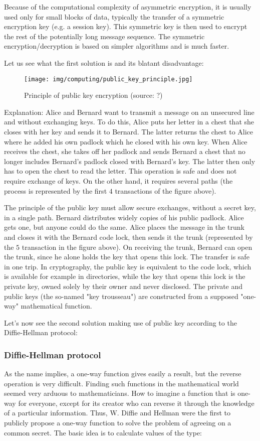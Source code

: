 	Because of the computational complexity of asymmetric encryption, it is usually used only for small blocks of data, typically the transfer of a symmetric encryption key (e.g. a session key). This symmetric key is then used to encrypt the rest of the potentially long message sequence. The symmetric encryption/decryption is based on simpler algorithms and is much faster.
	
	Let us see what the first solution is and its blatant disadvantage:
	\begin{figure}[H]
		\centering
		\texttt{[image: img/computing/public\_key\_principle.jpg]}
		\caption[Principle of public key encryption]{Principle of public key encryption (source: ?)}
	\end{figure}
	Explanation: Alice and Bernard want to transmit a message on an unsecured line and without exchanging keys. To do this, Alice puts her letter in a chest that she closes with her key and sends it to Bernard. The latter returns the chest to Alice where he added his own padlock which he closed with his own key. When Alice receives the chest, she takes off her padlock and sends Bernard a chest that no longer includes Bernard's padlock closed with Bernard's key. The latter then only has to open the chest to read the letter. This operation is safe and does not require exchange of keys. On the other hand, it requires several paths (the process is represented by the first $4$ transactions of the figure above).
	
	The principle of the public key must allow secure exchanges, without a secret key, in a single path. Bernard distributes widely copies of his public padlock. Alice gets one, but anyone could do the same. Alice places the message in the trunk and closes it with the Bernard code lock, then sends it the trunk (represented by the $5$ transaction in the figure above). On receiving the trunk, Bernard can open the trunk, since he alone holds the key that opens this lock. The transfer is safe in one trip. In cryptography, the public key is equivalent to the code lock, which is available for example in directories, while the key that opens this lock is the private key, owned solely by their owner and never disclosed. The private and public keys (the so-named "key trousseau") are constructed from a supposed "one-way" mathematical function.

	Let's now see the second solution making use of public key according to the Diffie-Hellman protocol:
	
	\subsubsection{Diffie-Hellman protocol}
	As the name implies, a one-way function gives easily a result, but the reverse operation is very difficult. Finding such functions in the mathematical world seemed very arduous to mathematicians. How to imagine a function that is one-way for everyone, except for its creator who can reverse it through the knowledge of a particular information. Thus, W. Diffie and Hellman were the first to publicly propose a one-way function to solve the problem of agreeing on a common secret. The basic idea is to calculate values of the type:
	
